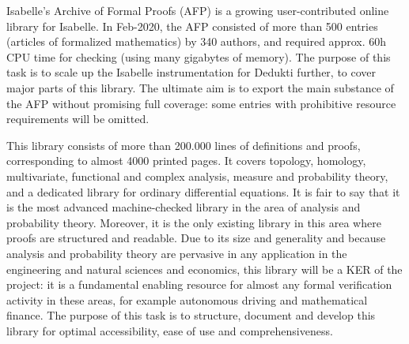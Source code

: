 \begin{workpackage}[id=libraries,wphases=0-48,type=RTD,
  short=Libraries,%
  title=Libraries,
  lead=Inr,
  InrRM=10,
  TumRM=42]
\begin{tasklist}
\begin{task}[id=mathcomp,title=MathComp]
\end{task}

\begin{task}[id=milc,title=Revised Coq Analysis Library]
\end{task}


\begin{task}[id=afp,title=Isabelle's Archive of Formal Proofs]
Isabelle's Archive of Formal Proofs (AFP) \cite{isabelle-afp} is a
growing user-contributed online library for Isabelle. In Feb-2020, the
AFP consisted of more than 500 entries (articles of formalized
mathematics) by 340 authors, and required approx. 60h CPU time for
checking (using many gigabytes of memory).  The purpose of this task
is to scale up the Isabelle instrumentation for Dedukti further, to
cover major parts of this library. The ultimate aim is to export the main
substance of the AFP without promising full coverage: some entries
with prohibitive resource requirements will be omitted.
\end{task}

\begin{task}[id=isaAnalysisProb,title=The Isabelle Analysis \&
  Probability Theory library]
This library consists of more than
200.000 lines of definitions and proofs, corresponding to almost 4000 printed
pages. It covers topology, homology, multivariate, functional and complex
analysis, measure and probability theory, and a dedicated library for
ordinary differential equations. It is fair to say that it is the most
advanced machine-checked library in the area of analysis and probability
theory. Moreover, it is the only existing library in this area where
proofs are structured and readable. Due to its size and generality and
because analysis and probability theory are pervasive in any application in
the engineering and natural sciences and economics, this library will be a
KER of the project: it is a fundamental enabling resource for almost any
formal verification activity in these areas, for example autonomous driving
and mathematical finance. The purpose of this task is to structure, document
and develop this library for optimal accessibility, ease of use and
comprehensiveness.


\end{task}
\end{tasklist}
\end{workpackage}
